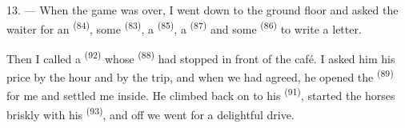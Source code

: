 13. --- When the game was over, I went down to the ground floor and asked the waiter for an
 \textsuperscript{(84)}, some  \textsuperscript{(83)}, a
 \textsuperscript{(85)}, a  \textsuperscript{(87)} and some
 \textsuperscript{(86)} to write a letter.

Then I called a  \textsuperscript{(92)} whose 
\textsuperscript{(88)} had stopped in front of the café. I asked him his price by the hour and
by the trip, and when we had agreed, he opened the
 \textsuperscript{(89)} for me and settled me inside. He climbed
back on to his  \textsuperscript{(91)}, started the horses briskly with his
 \textsuperscript{(93)}, and off we went for a delightful drive.
\VUsaut{6.0mm}
\VUfilet{22mm}
